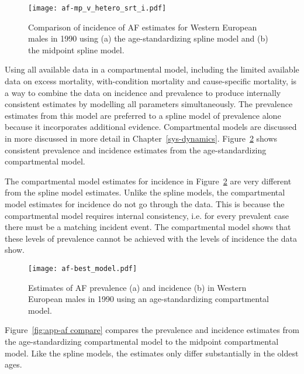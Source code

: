     \begin{figure}[h]
        \begin{center}
            \texttt{[image: af-mp\_v\_hetero\_srt\_i.pdf]}
            \caption{Comparison of incidence of AF estimates for Western European
              males in 1990 using (a) the age-standardizing spline model and (b)
              the midpoint spline model.}
            \label{fig:app-af srt i}
        \end{center}
    \end{figure}

Using all available data in a compartmental model, including the
limited available data on excess mortality, with-condition mortality
and cause-specific mortality, is a way to combine the data on
incidence and prevalence to produce internally consistent estimates by modelling all
parameters simultaneously.  The prevalence estimates from this model
are preferred to a spline model of prevalence alone because it
incorporates additional evidence.  Compartmental models are discussed in
more discussed in more detail in Chapter~\ref{sys-dynamics}.  Figure~\ref{fig:app-af age-stand} shows consistent prevalence and incidence estimates
from the age-standardizing compartmental model.

The compartmental model estimates for incidence in Figure~\ref{fig:app-af age-stand}
are very different from the spline model estimates.
Unlike the spline models, the compartmental model estimates for
incidence do not go through the data.  This is because the compartmental model
requires internal consistency, i.e. for every prevalent case there must be
a matching incident event.  The compartmental model shows that these levels
of prevalence cannot be achieved with the levels of incidence the data show.

    \begin{figure}[h]
        \begin{center}
            \texttt{[image: af-best\_model.pdf]}
            \caption{Estimates of AF prevalence (a) and incidence (b)
              in Western European males in 1990 using
              an age-standardizing compartmental model.}
            \label{fig:app-af age-stand}
        \end{center}
    \end{figure}

Figure~\ref{fig:app-af compare} compares the prevalence and incidence
estimates from the age-standardizing compartmental model to the
midpoint compartmental model.  Like the spline models, the
estimates only differ substantially in the oldest ages.

